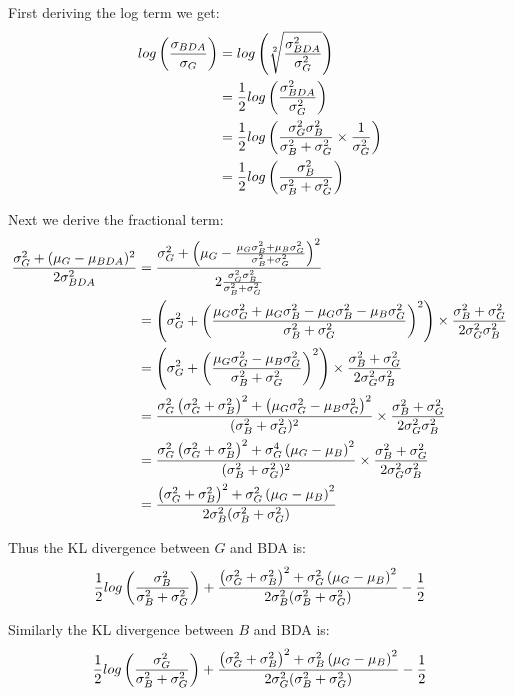 First deriving the log term we get:
\begin{align}
    log\left(\frac{\sigma_{BDA}}{\sigma_{G}}\right)
    &= log\left(\sqrt[2]{\frac{\sigma_{BDA}^2}{\sigma_{G}^2}}\right)\\
    &= \frac{1}{2} log\left(\frac{\sigma_{BDA}^2}{\sigma_{G}^2}\right)\\
    &= \frac{1}{2} log\left(\frac{\sigma_G^2 \sigma_B^2}{\sigma_B^2 + \sigma_G^2} \times \frac{1}{\sigma_G^2}\right)\\
    &= \frac{1}{2} log\left(\frac{\sigma_B^2}{\sigma_B^2 + \sigma_G^2}\right)
\end{align}

Next we derive the fractional term:
\begin{align}
    \frac{\sigma_{G}^2 + (\mu_{G} - \mu_{BDA})^2}{2\sigma_{BDA}^2}
    &= \frac{
            \sigma_G^2 + \left(\mu_G - \frac{\mu_G\sigma_B^2 + \mu_B\sigma_G^2}{\sigma_B^2 + \sigma_G^2}\right)^2
        }{
            2 \frac{\sigma_G^2 \sigma_B^2}{\sigma_B^2 + \sigma_G^2}
        }\\
    &= \left(\sigma_G^2 + \left(\frac{\mu_G\sigma_G^2 + \mu_G\sigma_B^2 - \mu_G\sigma_B^2 - \mu_B\sigma_G^2}{\sigma_B^2 + \sigma_G^2}\right)^2\right) \times \frac{\sigma_B^2 + \sigma_G^2}{2\sigma_G^2\sigma_B^2}\\
    &= \left(\sigma_G^2 + \left(\frac{\mu_G\sigma_G^2 - \mu_B\sigma_G^2}{\sigma_B^2 + \sigma_G^2}\right)^2\right) \times \frac{\sigma_B^2 + \sigma_G^2}{2\sigma_G^2\sigma_B^2}\\
    &= \frac{\sigma_G^2\left(\sigma_G^2 + \sigma_B^2\right)^2  + \left(\mu_G\sigma_G^2 - \mu_B\sigma_G^2\right)^2}{(\sigma_B^2 + \sigma_G^2)^2} \times \frac{\sigma_B^2 + \sigma_G^2}{2\sigma_G^2\sigma_B^2}\\
    &= \frac{\sigma_G^2\left(\sigma_G^2 + \sigma_B^2\right)^2  + \sigma_G^4\left(\mu_G - \mu_B\right)^2}{(\sigma_B^2 + \sigma_G^2)^2} \times \frac{\sigma_B^2 + \sigma_G^2}{2\sigma_G^2\sigma_B^2}\\
    &= \frac{\left(\sigma_G^2 + \sigma_B^2\right)^2  + \sigma_G^2\left(\mu_G - \mu_B\right)^2}{2\sigma_B^2(\sigma_B^2 + \sigma_G^2)}
\end{align}

Thus the KL divergence between $G$ and BDA is:
\begin{equation}
    \frac{1}{2} log\left(\frac{\sigma_B^2}{\sigma_B^2 + \sigma_G^2}\right) + \frac{\left(\sigma_G^2 + \sigma_B^2\right)^2  + \sigma_G^2\left(\mu_G - \mu_B\right)^2}{2\sigma_B^2(\sigma_B^2 + \sigma_G^2)} - \frac{1}{2}
\end{equation}

Similarly the KL divergence between $B$ and BDA is:
\begin{equation}
    \frac{1}{2} log\left(\frac{\sigma_G^2}{\sigma_B^2 + \sigma_G^2}\right) + \frac{\left(\sigma_G^2 + \sigma_B^2\right)^2  + \sigma_B^2\left(\mu_G - \mu_B\right)^2}{2\sigma_G^2(\sigma_B^2 + \sigma_G^2)} - \frac{1}{2}
\end{equation}

